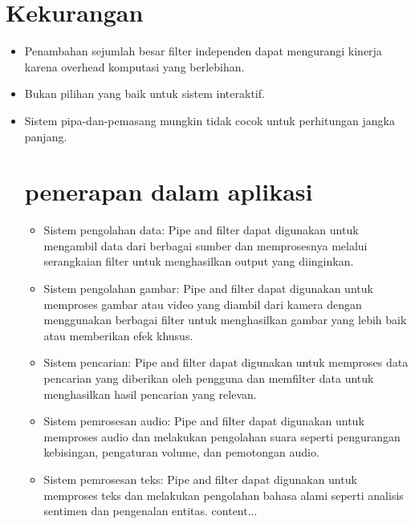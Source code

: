 \documentclass{article}
\begin{document}
	
	\section{Kekurangan}
	
	\begin{itemize}
		\item 	Penambahan sejumlah besar filter independen dapat mengurangi kinerja karena overhead komputasi yang berlebihan.
		\item Bukan pilihan yang baik untuk sistem interaktif.
		\item Sistem pipa-dan-pemasang mungkin tidak cocok untuk perhitungan jangka panjang.
		
	\section{penerapan dalam aplikasi}
	\begin{itemize}
		\item Sistem pengolahan data: Pipe and filter dapat digunakan untuk mengambil data dari berbagai sumber dan memprosesnya melalui serangkaian filter untuk menghasilkan output yang diinginkan.
			
		\item Sistem pengolahan gambar: Pipe and filter dapat digunakan untuk memproses gambar atau video yang diambil dari kamera dengan menggunakan berbagai filter untuk menghasilkan gambar yang lebih baik atau memberikan efek khusus.
			
		\item Sistem pencarian: Pipe and filter dapat digunakan untuk memproses data pencarian yang diberikan oleh pengguna dan memfilter data untuk menghasilkan hasil pencarian yang relevan.
			
		\item Sistem pemrosesan audio: Pipe and filter dapat digunakan untuk memproses audio dan melakukan pengolahan suara seperti pengurangan kebisingan, pengaturan volume, dan pemotongan audio.
			
		\item Sistem pemrosesan teks: Pipe and filter dapat digunakan untuk memproses teks dan melakukan pengolahan bahasa alami seperti analisis sentimen dan pengenalan entitas.
			content...
		\end{itemize}
	\end{itemize}
\end{document}
